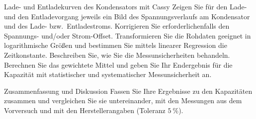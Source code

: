 \documentclass[twoside]{protokoll}
\begin{document}
    
 
 
\begin{aufgabe}{Lade- und Entladekurven des Kondensators mit Cassy}
  Zeigen Sie für den Lade- und den Entladevorgang jeweils ein Bild des
  Spannungsverlaufs am Kondensator und des Lade- bzw.~Entladestroms.
  Korrigieren Sie erforderlichenfalls den Spannungs- und/oder
  Strom-Offset. Transformieren Sie die Rohdaten geeignet in
  logarithmische Größen und bestimmen Sie mittels linearer Regression
  die Zeitkonstante. Beschreiben Sie, wie Sie die Messunsicherheiten
  behandeln. Berechnen Sie das gewichtete Mittel und geben Sie Ihr
  Endergebnis für die Kapazität mit statistischer und systematischer
  Messunsicherheit an.
\end{aufgabe}


\begin{aufgabe}{Zusammenfassung und Diskussion}
  Fassen Sie Ihre Ergebnisse zu den Kapazitäten zusammen und
  vergleichen Sie sie untereinander, mit den Messungen aus dem
  Vorversuch und mit den Herstellerangaben (Toleranz
  $\SI{5}{\percent}$).  
\end{aufgabe}
 
\end{document}
